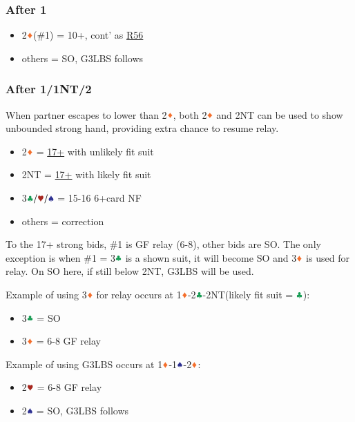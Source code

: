 \documentclass{article}
\begin{document}
\begin{multicols}{2}
\begin{CJK*}{UTF8}{gt}
\subsubsection{After 1\CCC}
\begin{itemize}
    \item 2$\ddd$(\#1) = 10+, cont' as \hyperref[sec:nlm3r56]{R56}
    \item others = SO, G3LBS follows
\end{itemize}

\subsubsection{After 1\SSS/1NT/2\CCC}\label{sec:1d-escape}
When partner escapes to lower than 2$\ddd$, both 2$\ddd$ and 2NT can be used to show unbounded strong hand, providing extra chance to resume relay.
\begin{itemize}
    \item 2$\ddd$ = \hyperref[sec:2suit-strong-rebid]{17+} with unlikely fit suit
    \item 2NT = \hyperref[sec:2suit-strong-rebid]{17+} with likely fit suit
    \item 3$\ccc/\hhh/\sss$ = 15-16 6+card NF
    \item others = correction
\end{itemize}
\vspace{1em}

\noindent To the 17+ strong bids, \#1 is GF relay (6-8), other bids are SO. The only exception is when \#1 = 3$\ccc$ is a shown suit, it will become SO and 3$\ddd$ is used for relay. On SO here, if still below 2NT, G3LBS will be used.

\noindent Example of using 3$\ddd$ for relay occurs at 1$\ddd$-2$\ccc$-2NT(likely fit suit = $\ccc$):
\begin{itemize}
    \item 3$\ccc$ = SO
    \item 3$\ddd$ = 6-8 GF relay
\end{itemize}
\vspace{1em}

\noindent Example of using G3LBS occurs at 1$\ddd$-1$\sss$-2$\ddd$:
\begin{itemize}
    \item 2$\hhh$ = 6-8 GF relay
    \item 2$\sss$ = SO, G3LBS follows
\end{itemize}


\end{CJK*}
\end{multicols}
\end{document}
